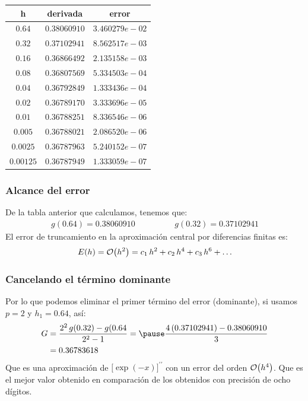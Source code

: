 \documentclass[12pt]{beamer}
\begin{document}
\begin{frame}
\begin{table}
\centering
\renewcommand{\arraystretch}{0.8}
\begin{tabular}{c c c }
h & derivada & error \\ \hline
$0.64$    & $0.38060910$ & $3.460279e-02$ \\ \hline
$0.32$    & $0.37102941$ & $8.562517e-03$ \\ \hline
$0.16$    & $0.36866492$ & $2.135158e-03$ \\ \hline
$0.08$    & $0.36807569$ & $5.334503e-04$ \\ \hline
$0.04$    & $0.36792849$ & $1.333436e-04$ \\ \hline
$0.02$    & $0.36789170$ & $3.333696e-05$ \\ \hline
$0.01$    & $0.36788251$ & $8.336546e-06$ \\ \hline
$0.005$   & $0.36788021$ & $2.086520e-06$ \\ \hline
$0.0025$  & $0.36787963$ & $5.240152e-07$ \\ \hline
$0.00125$ & $0.36787949$ & $1.333059e-07$ \\ \hline
\hline
\end{tabular}
\end{table}
\end{frame}
\begin{frame}
\frametitle{Alcance del error}
De la tabla anterior que calculamos, tenemos que:
\pause
\begin{align*}
g (0.64) = 0.38060910 \hspace{2cm} g (0.32) = 0.37102941
\end{align*}
\pause
El error de truncamiento en la aproximación central por diferencias finitas es:
\pause
\begin{align*}
E (h) = \order{h^{2}} = c_{1} \, h^{2} + c_{2} \, h^{4} + c_{3} \, h^{6} + \ldots
\end{align*}
\end{frame}
\begin{frame}
\frametitle{Cancelando el término dominante}
Por lo que podemos eliminar el primer término del error (dominante), si usamos $p = 2$ y $h_{1} = 0.64$, así:
\pause
\begin{eqnarray*}
\begin{aligned}
G &= \dfrac{2^{2} \, g(0.32) - g(0.64}{2^{2} - 1} = \pause \dfrac{4 \, (0.37102941) - 0.38060910}{3} \\
&= 0.36783618
\end{aligned}
\end{eqnarray*}
Que es una aproximación de $\big[ \exp(-x) \big]^{\prime \prime}$ con un error del orden $\order{h^{4}}$. \pause Que es el mejor valor obtenido en comparación de los obtenidos con precisión de ocho dígitos.
\end{frame}
\end{document}
